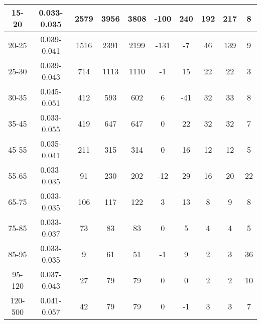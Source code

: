 \documentclass{beamer}
\begin{document}
\begin{frame}
\begin{table}[h]
\begin{center}
\begin{tabular}{|c|c|c|c|c|c|c|c|c|c|}
    15-20 & 0.033-0.035 & 2579 & 3956 & 3808 & -100 & 240 & 192 & 217 & 8  \\ \hline
    20-25 & 0.039-0.041 & 1516 & 2391 & 2199 & -131 & -7 & 46 & 139 & 9  \\ \hline
    25-30 & 0.039-0.043 & 714 & 1113 & 1110 & -1 & 15 & 22 & 22 & 3  \\ \hline
    30-35 & 0.045-0.051 & 412 & 593 & 602 & 6 & -41 & 32 & 33 & 8  \\ \hline
    35-45 & 0.033-0.055 & 419 & 647 & 647 & 0 & 22 & 32 & 32 & 7  \\ \hline
    45-55 & 0.035-0.041 & 211 & 315 & 314 & 0 & 16 & 12 & 12 & 5  \\ \hline
    55-65 & 0.033-0.035 & 91 & 230 & 202 & -12 & 29 & 16 & 20 & 22  \\ \hline
    65-75 & 0.033-0.035 & 106 & 117 & 122 & 3 & 13 & 8 & 9 & 8  \\ \hline
    75-85 & 0.033-0.037 & 73 & 83 & 83 & 0 & 5 & 4 & 4 & 5  \\ \hline
    85-95 & 0.033-0.035 & 9 & 61 & 51 & -1 & 9 & 2 & 3 & 36  \\ \hline
    95-120 & 0.037-0.043 & 27 & 79 & 79 & 0 & 0 & 2 & 2 & 10  \\ \hline
    120-500 & 0.041-0.057 & 42 & 79 & 79 & 0 & -1 & 3 & 3 & 7  \\ \hline
  \end{tabular}
  \label{tab:systSbVar_Meth1_MUON_ZGamma_Endcap}
  \end{center}
\end{table}
\end{frame}
\end{document}
